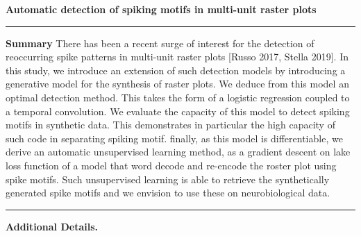 \documentclass[11pt]{article}
\begin{document}
{\Large\bf 
Automatic detection of spiking motifs in multi-unit raster plots
}

\hrule
\textbf{Summary} %
There has been a recent surge of interest for the detection of reoccurring spike patterns in multi-unit raster plots [Russo 2017, Stella 2019]. In this study, we introduce an extension of such detection models by introducing a generative model for the synthesis of raster plots. We deduce from this model an optimal detection method. This takes the form of a logistic regression coupled to a temporal convolution. We evaluate the capacity of this model to detect spiking motifs in synthetic data. This demonstrates in particular the high capacity of such code in separating spiking motif. finally, as this model is differentiable, we derive an automatic unsupervised learning method, as a gradient descent on lake loss function of a model that word decode and re-encode the roster plot using spike motifs. Such unsupervised learning is able to retrieve the synthetically generated spike motifs and we envision to use these on neurobiological data.
\vspace{.5cm}
\hrule
\textbf{Additional Details.}%
%
\end{document}
